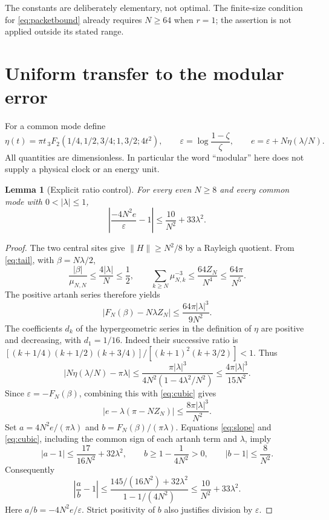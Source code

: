 \documentclass[10pt]{article}
\newtheorem{lemma}[theorem]{Lemma}
\begin{document}
The constants are deliberately elementary, not optimal. The finite-size
condition for \eqref{eq:packetbound} already requires $N\ge64$ when
$r=1$; the assertion is not applied outside its stated range.

\section{Uniform transfer to the modular error}
For a common mode define
\[
\eta(t)=\pi t\,{}_3F_2(1/4,1/2,3/4;1,3/2;4t^2),\qquad
\varepsilon=\log\frac{1-\zeta}{\zeta},\qquad
e=\varepsilon+N\eta(\lambda/N).
\]
All quantities are dimensionless. In particular the word ``modular''
here does not supply a physical clock or an energy unit.
\begin{lemma}[Explicit ratio control]
For every even $N\ge8$ and every common mode with $0<|\lambda|\le1$,
\begin{equation}
\left|\frac{-4N^2e}{\varepsilon}-1\right|
\le\frac{10}{N^2}+33\lambda^2.\label{eq:ratio}
\end{equation}
\end{lemma}
\begin{proof}
The two central sites give $\|H\|\ge N^2/8$ by a Rayleigh quotient.
From \eqref{eq:tail}, with $\beta=N\lambda/2$,
\[
\frac{|\beta|}{\mu_{N,N}}\le\frac{4|\lambda|}N\le\frac12,
\qquad
\sum_{k\ge N}\mu_{N,k}^{-3}\le\frac{64Z_N}{N^4}
\le\frac{64\pi}{N^5}.
\]
The positive artanh series therefore yields
\begin{equation}
|F_N(\beta)-N\lambda Z_N|
\le\frac{64\pi|\lambda|^3}{9N^2}.\label{eq:cubic}
\end{equation}
The coefficients $d_k$ of the hypergeometric series in the definition
of $\eta$ are positive and decreasing, with $d_1=1/16$. Indeed their
successive ratio is
$[(k+1/4)(k+1/2)(k+3/4)]/[(k+1)^2(k+3/2)]<1$.
Thus
\[
|N\eta(\lambda/N)-\pi\lambda|
\le\frac{\pi|\lambda|^3}{4N^2(1-4\lambda^2/N^2)}
\le\frac{4\pi|\lambda|^3}{15N^2}.
\]
Since $\varepsilon=-F_N(\beta)$, combining this with
\eqref{eq:cubic} gives
\[
|e-\lambda(\pi-NZ_N)|\le\frac{8\pi|\lambda|^3}{N^2}.
\]
Set $a=4N^2e/(\pi\lambda)$ and
$b=F_N(\beta)/(\pi\lambda)$. Equations \eqref{eq:slope} and
\eqref{eq:cubic}, including the common sign of each artanh term and
$\lambda$, imply
\[
|a-1|\le\frac{17}{16N^2}+32\lambda^2,\qquad
b\ge1-\frac1{4N^2}>0,\qquad |b-1|\le\frac8{N^2}.
\]
Consequently
\[
\left|\frac ab-1\right|
\le\frac{145/(16N^2)+32\lambda^2}{1-1/(4N^2)}
\le\frac{10}{N^2}+33\lambda^2.
\]
Here $a/b=-4N^2e/\varepsilon$. Strict positivity of $b$ also
justifies division by $\varepsilon$.
\end{proof}
\end{document}
